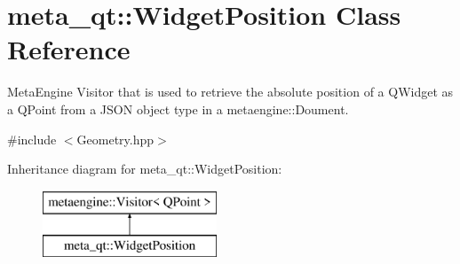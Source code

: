 \hypertarget{classmeta__qt_1_1_widget_position}{}\section{meta\+\_\+qt\+:\+:Widget\+Position Class Reference}
\label{classmeta__qt_1_1_widget_position}


Meta\+Engine Visitor that is used to retrieve the absolute position of a Q\+Widget as a Q\+Point from a J\+S\+O\+N object type in a metaengine\+::\+Doument.  




{\ttfamily \#include $<$Geometry.\+hpp$>$}

Inheritance diagram for meta\+\_\+qt\+:\+:Widget\+Position\+:\begin{figure}[H]
\begin{center}
\leavevmode
\includegraphics[height=2.000000cm]{classmeta__qt_1_1_widget_position}
\end{center}
\end{figure}
